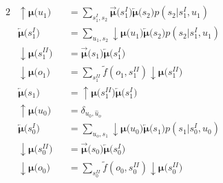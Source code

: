 \documentclass[fleqn]{article}
\begin{document}
\begin{minipage}[t]{0.5\textwidth}
    \begin{alignat}{2}
         & \bm{{\uparrow}{\mu}(}u_1\bm{)}                                   &  & = \sum_{s^{\scriptscriptstyle I}_1, s_2} \bm{\overrightarrow{\mu}(}s^{\scriptscriptstyle I}_1\bm{)} \bm{\overleftarrow{\mu}(}s_2\bm{)} p(s_2|{s^{\scriptscriptstyle I}_1},u_1) \\
         & \bm{\overleftarrow{\mu}(}s^{\scriptscriptstyle I}_1\bm{)}        &  & = \sum_{u_1, s_2} \bm{{\downarrow}{\mu}(}u_1\bm{)} \bm{\overleftarrow{\mu}(}s_2\bm{)} p(s_2|s^{\scriptscriptstyle I}_1,u_1)                                                    \\
         & \bm{{\downarrow}{\mu}(}s^{\scriptscriptstyle II}_1\bm{)}         &  & = \bm{\overrightarrow{\mu}(}s_1\bm{)} \bm{\overleftarrow{\mu}(}s^{\scriptscriptstyle I}_1\bm{)}                                                                                \\
         & \bm{{\downarrow}{\mu}(}o_1\bm{)}                                 &  & = \sum_{s^{\scriptscriptstyle II}_1} \tilde{f}(o_1,s^{\scriptscriptstyle II}_1) \bm{{\downarrow}{\mu}(}s^{\scriptscriptstyle II}_1\bm{)}                                       \\
         & \bm{\overleftarrow{\mu}(}s_1\bm{)}                               &  & = \bm{{\uparrow}{\mu}(}s^{\scriptscriptstyle II}_1\bm{)} \bm{\overleftarrow{\mu}(}s^{\scriptscriptstyle I}_1\bm{)}                                                             \\
         & \bm{{\uparrow}{\mu}(}u_0\bm{)}                                   &  & = \delta_{u_0, \hat{u}_o}                                                                                                                                                      \\
         & \bm{\overleftarrow{\mu}(}s^{\scriptscriptstyle I}_0\bm{)}        &  & = \sum_{u_o, s_1} \bm{{\downarrow}{\mu}(}u_0\bm{)} \bm{\overleftarrow{\mu}(}s_1\bm{)} p(s_1|s^{\scriptscriptstyle I}_0,u_0)                                                    \\
         & \bm{{\downarrow}{\mu}(}s^{\scriptscriptstyle II}_0\bm{)}         &  & = \bm{\overrightarrow{\mu}(}s_0\bm{)} \bm{\overleftarrow{\mu}(}s^{\scriptscriptstyle I}_0\bm{)}                                                                                \\
         & \bm{{\downarrow}{\mu}(}o_0\bm{)}                                 &  & = \sum_{s^{\scriptscriptstyle II}_0} \tilde{f}(o_0,s^{\scriptscriptstyle II}_0) \bm{{\downarrow}{\mu}(}s^{\scriptscriptstyle II}_0\bm{)}                                       \\

\end{alignat}
\end{minipage}
\end{document}
